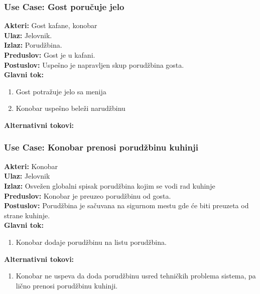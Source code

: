 \documentclass{article}
\begin{document}
\subsubsection{\textbf{Use Case}: Gost poručuje jelo}
\textbf{Akteri:} Gost kafane, konobar\\
\textbf{Ulaz:} Jelovnik.\\
\textbf{Izlaz:} Porudžbina.\\
\textbf{Preduslov:} Gost je u kafani.\\
\textbf{Postuslov:} Uspešno je napravljen skup porudžbina gosta.\\
\textbf{Glavni tok:}
\begin{enumerate}
\item Gost potražuje jelo sa menija
\item Konobar uspešno beleži narudžbinu \\
\end{enumerate}
\textbf{Alternativni tokovi:} \

\subsubsection{\textbf{Use Case:} Konobar prenosi porudžbinu kuhinji}
\textbf{Akteri:} Konobar\\
\textbf{Ulaz:} Jelovnik\\
\textbf{Izlaz:} Osvežen globalni spisak porudžbina kojim se vodi rad kuhinje\\
\textbf{Preduslov:} Konobar je preuzeo porudžbinu od gosta.\\
\textbf{Postuslov:} Porudžbina je sačuvana na sigurnom mestu gde će biti preuzeta od strane kuhinje.\\
\textbf{Glavni tok:}
\begin{enumerate}
\item Konobar dodaje porudžbinu na listu porudžbina.
\end{enumerate}
\textbf{Alternativni tokovi:}
\begin{enumerate}
\item Konobar ne uspeva da doda porudžbinu usred tehničkih problema sistema, pa lično prenosi porudžbinu kuhinji.
\end{enumerate}
\end{document}

